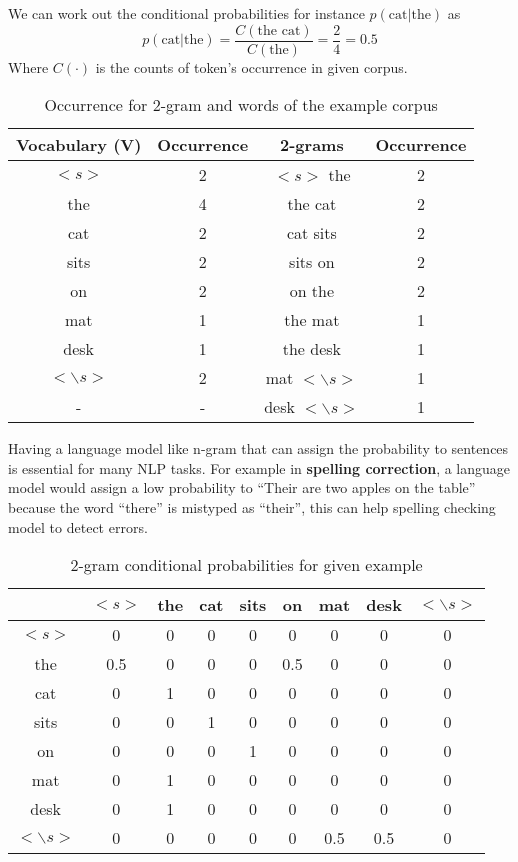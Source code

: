 We can work out the conditional probabilities for instance $p(\text{cat}|\text{the})$ as
\begin{equation}
p(\text{cat}|\text{the}) = \frac{C(\text{the cat})}{C(\text{the})} = \frac{2}{4} = 0.5
\end{equation}
Where $C(\cdot)$ is the counts of token's occurrence in given corpus.
\begin{table}[H]
	\centering
	\begin{tabular}{c|c||c|c}
		\textbf{Vocabulary} ($\mathbf{V}$) & Occurrence& \textbf{2-grams} & Occurrence\\
		\hline
		$<s>$ & 2 &$<s>$ the& 2\\
		the & 4&the cat &2\\
		cat & 2&cat sits& 2\\
		sits &2 &sits on &2\\
		on &2& on the &2\\
		mat &1 &the mat &1\\
		desk &1 &the desk &1\\
		$<\backslash s>$ &2 &mat $<\backslash s>$&1\\
		-& - &desk $<\backslash s>$ &1 \\	
	\end{tabular}
	\caption{Occurrence for 2-gram and words of the example corpus}
\end{table}
\noindent
Having a language model like n-gram that can assign the probability to sentences is essential for many NLP tasks.
For example in \textbf{spelling correction}, a language model would assign a low probability to ``Their are two apples on the table'' because the word ``there'' is mistyped as ``their'',
this can help spelling checking model to detect errors\cite{jurafsky2000speech}. 
\begin{table}[H]
	\centering
	\begin{tabular}{c||cccccccc}
		& $<s>$ & the & cat & sits & on & mat & desk & $<\backslash s>$ \\
		\hline
		$<s>$ &0 & 0 & 0& 0 & 0& 0& 0 & 0\\
		the &0.5&0&0&0&0.5&0&0&0\\
		cat &0&1&0&0&0&0&0&0\\
		sits &0&0&1&0&0&0&0&0\\
		on &0&0&0&1&0&0&0&0\\
		mat &0&1&0&0&0&0&0&0\\
		desk &0&1&0&0&0&0&0&0\\
		$<\backslash s>$ &0&0&0&0&0&0.5&0.5&0\\
	\end{tabular}
	\caption{2-gram conditional probabilities for given example}
\end{table}

